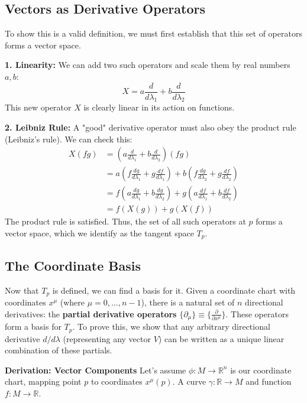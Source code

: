 \documentclass[11pt, a4paper]{report}
\begin{document}
\subsection*{Vectors as Derivative Operators}
To show this is a valid definition, we must first establish that this set of operators forms a vector space.

\textbf{1. Linearity:} We can add two such operators and scale them by real numbers $a, b$:
\[
    X = a \frac{d}{d\lambda_1} + b \frac{d}{d\lambda_2}
\]
This new operator $X$ is clearly linear in its action on functions.

\textbf{2. Leibniz Rule:} A "good" derivative operator must also obey the product rule (Leibniz's rule). We can check this:
\begin{align*}
    X(fg) &= \left(a \frac{d}{d\lambda_1} + b \frac{d}{d\lambda_2}\right) (fg) \\
    &= a \left( f \frac{dg}{d\lambda_1} + g \frac{df}{d\lambda_1} \right) + b \left( f \frac{dg}{d\lambda_2} + g \frac{df}{d\lambda_2} \right) \\
    &= f \left( a \frac{dg}{d\lambda_1} + b \frac{dg}{d\lambda_2} \right) + g \left( a \frac{df}{d\lambda_1} + b \frac{df}{d\lambda_2} \right) \\
    &= f (X(g)) + g (X(f))
\end{align*}
The product rule is satisfied. Thus, the set of all such operators at $p$ forms a vector space, which we identify as the tangent space $T_p$.

\subsection*{The Coordinate Basis}
Now that $T_p$ is defined, we can find a basis for it. Given a coordinate chart with coordinates $x^\mu$ (where $\mu = 0, \dots, n-1$), there is a natural set of $n$ directional derivatives: the \textbf{partial derivative operators} $\{\partial_\mu\} \equiv \{\frac{\partial}{\partial x^\mu}\}$.
% 
% 
% 
% 
% 
% 
% 
% 
% 
% 
% 
% 
% 
% 
% 
% 
% 
% 
These operators form a basis for $T_p$. To prove this, we show that any arbitrary directional derivative $d/d\lambda$ (representing any vector $V$) can be written as a unique linear combination of these partials.

\textbf{Derivation: Vector Components}
Let's assume $\phi : M \rightarrow \mathbb{R}^n$ is our coordinate chart, mapping point $p$ to coordinates $x^\mu(p)$. A curve $\gamma : \mathbb{R} \rightarrow M$ and function $f : M \rightarrow \mathbb{R}$.
\end{document}
